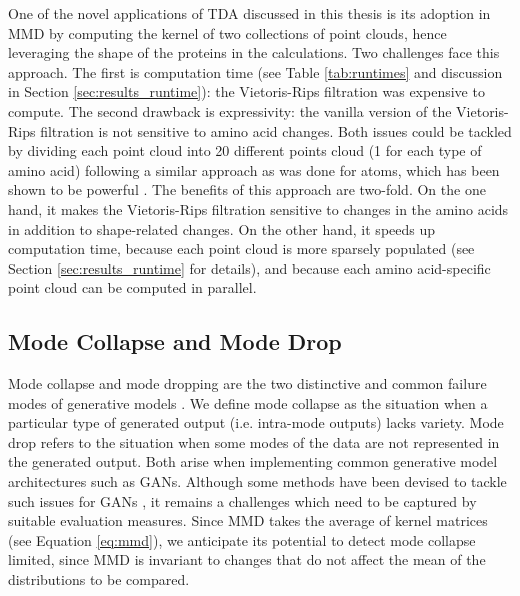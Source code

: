 One of the novel applications of TDA discussed in this thesis is its adoption in
MMD by computing the kernel of two collections of point clouds, hence leveraging
the shape of the proteins in the calculations. Two challenges face this
approach. The first is computation time (see Table \ref{tab:runtimes} and
discussion in Section \ref{sec:results_runtime}): the Vietoris-Rips filtration
was expensive to compute. The second drawback is expressivity: the vanilla
version of the Vietoris-Rips filtration is not sensitive to amino acid changes.
Both issues could be tackled by dividing each point cloud into 20 different
points cloud (1 for each type of amino acid) following a similar approach as was
done for atoms, which has been shown to be powerful \cite{jiang2021topological}.
The benefits of this approach are two-fold. On the one hand, it makes the
Vietoris-Rips filtration sensitive to changes in the amino acids in addition to
shape-related changes. On the other hand, it
speeds up computation time, because each point cloud is more sparsely populated
(see Section \ref{sec:results_runtime} for details), and because
each amino acid-specific point cloud can be computed in parallel.


\subsection{Mode Collapse and Mode Drop}

Mode collapse and mode dropping are the two distinctive and common failure modes
of generative models \citep{salimans2016improved}. We define mode collapse as
the situation when a particular type of generated output (i.e. intra-mode
outputs) lacks variety. Mode drop refers to the situation when some modes of the
data are not represented in the generated output. Both arise when implementing
common generative model architectures such as GANs. Although some methods have
been devised to tackle such issues for GANs \citep{arjovsky2017wasserstein,
goodfellow2014generative}, it remains a challenges which need to be captured by
suitable evaluation measures. Since MMD takes the average of kernel matrices
(see Equation \ref{eq:mmd}), we anticipate its potential to detect mode collapse
limited, since MMD is invariant to changes that do not affect the mean of the
distributions to be compared.

